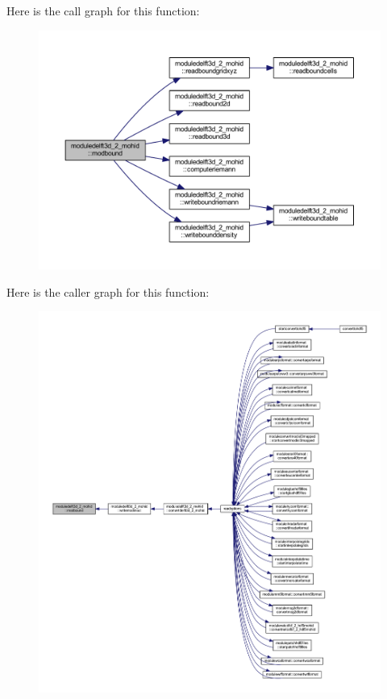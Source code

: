 Here is the call graph for this function\+:\nopagebreak
\begin{figure}[H]
\begin{center}
\leavevmode
\includegraphics[width=350pt]{namespacemoduledelft3d__2__mohid_a3fc3c3a94f1ee827e72b2345af34c6b0_cgraph}
\end{center}
\end{figure}
Here is the caller graph for this function\+:\nopagebreak
\begin{figure}[H]
\begin{center}
\leavevmode
\includegraphics[width=350pt]{namespacemoduledelft3d__2__mohid_a3fc3c3a94f1ee827e72b2345af34c6b0_icgraph}
\end{center}
\end{figure}
\mbox{\label{namespacemoduledelft3d__2__mohid_ad00b6a867c663519cfa8ad6f6d2b3532}} 

